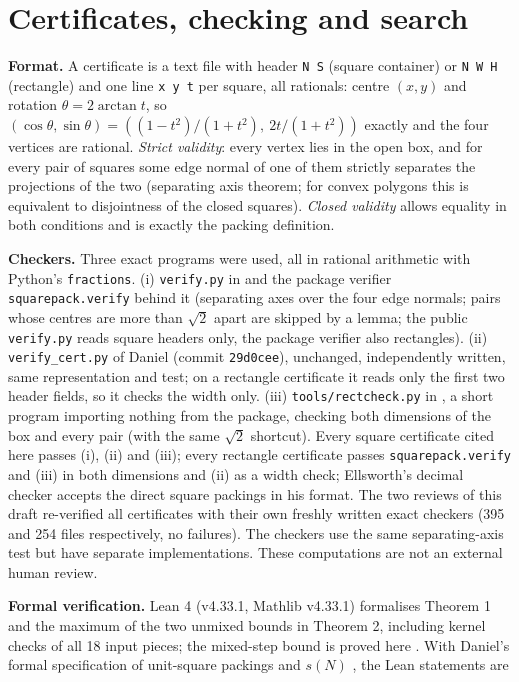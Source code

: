 \documentclass[11pt,letterpaper]{amsart}
\theoremstyle{plain}
\begin{document}
\section{Certificates, checking and search}

\textbf{Format.} A certificate is a text file with header \texttt{N S} (square container) or \texttt{N W H} (rectangle) and one line \texttt{x y t} per square, all rationals: centre $(x, y)$ and rotation $\theta = 2\arctan t$, so $(\cos\theta, \sin\theta) = ((1 - t^2)/(1 + t^2),\ 2t/(1 + t^2))$ exactly and the four vertices are rational. \emph{Strict validity}: every vertex lies in the open box, and for every pair of squares some edge normal of one of them strictly separates the projections of the two (separating axis theorem; for convex polygons this is equivalent to disjointness of the closed squares). \emph{Closed validity} allows equality in both conditions and is exactly the packing definition.

\textbf{Checkers.} Three exact programs were used, all in rational arithmetic with Python's \texttt{fractions}. (i) \texttt{verify.py} in \cite{Fan26} and the package verifier \texttt{squarepack.verify} behind it (separating axes over the four edge normals; pairs whose centres are more than $\sqrt 2$ apart are skipped by a lemma; the public \texttt{verify.py} reads square headers only, the package verifier also rectangles). (ii) \texttt{verify\_cert.py} of Daniel \cite{Dan26} (commit \texttt{29d0cee}), unchanged, independently written, same representation and test; on a rectangle certificate it reads only the first two header fields, so it checks the width only. (iii) \texttt{tools/rectcheck.py} in \cite{Fan26}, a short program importing nothing from the package, checking both dimensions of the box and every pair (with the same $\sqrt 2$ shortcut). Every square certificate cited here passes (i), (ii) and (iii); every rectangle certificate passes \texttt{squarepack.verify} and (iii) in both dimensions and (ii) as a width check; Ellsworth's decimal checker \cite{Ell26b} accepts the direct square packings in his format. The two reviews of this draft re-verified all certificates with their own freshly written exact checkers (395 and 254 files respectively, no failures). The checkers use the same separating-axis test but have separate implementations. These computations are not an external human review.

\textbf{Formal verification.} Lean 4 (v4.33.1, Mathlib v4.33.1) formalises Theorem 1 and the maximum of the two unmixed bounds in Theorem 2, including kernel checks of all 18 input pieces; the mixed-step bound is proved here \cite{FanL26}. With Daniel's formal specification of unit-square packings and $s(N)$ \cite[\texttt{Spec.lean}, vendored unchanged]{Dan26}, the Lean statements are
\end{document}
